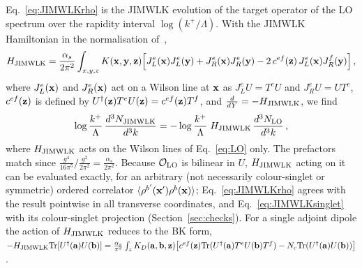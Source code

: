 Eq.~\eqref{eq:JIMWLKrho} is the JIMWLK evolution of the target operator of the LO spectrum over the rapidity interval $\log(k^+/\Lambda)$. With the JIMWLK Hamiltonian in the normalisation of~\cite{Lublinsky:2016meo},
\begin{align}\label{eq:HJIMWLK}
H_{\rm JIMWLK}=\frac{\alpha_s}{2\pi^2}\int_{x,y,z}K(\mathbf{x},\mathbf{y},\mathbf{z})\Big[J_L^e(\mathbf{x})J_L^e(\mathbf{y})+J_R^e(\mathbf{x})J_R^e(\mathbf{y})-2\,c^{ef}(\mathbf{z})\,J_L^e(\mathbf{x})J_R^f(\mathbf{y})\Big]\,,
\end{align}
where $J_L^e(\mathbf{x})$ and $J_R^e(\mathbf{x})$ act on a Wilson line at $\mathbf{x}$ as $J_L^eU=T^eU$ and $J_R^eU=UT^e$, $c^{ef}(\mathbf{z})$ is defined by $U^\dagger(\mathbf{z})T^eU(\mathbf{z})=c^{ef}(\mathbf{z})T^f$, and $\frac{d}{dY}=-H_{\rm JIMWLK}$, we find
\begin{align}\label{eq:JIMWLKasLO}
\log\frac{k^+}{\Lambda}\,\frac{d^3N_{\rm JIMWLK}}{d^3k}=-\log\frac{k^+}{\Lambda}\;H_{\rm JIMWLK}\,\frac{d^3N_{\rm LO}}{d^3k}\,,
\end{align}
where $H_{\rm JIMWLK}$ acts on the Wilson lines of Eq.~\eqref{eq:LO} only. The prefactors match since $\frac{g^4}{16\pi^5}\big/\frac{g^2}{2\pi^2}=\frac{\alpha_s}{2\pi^2}$. Because $\mathcal O_{\rm LO}$ is bilinear in $U$, $H_{\rm JIMWLK}$ acting on it can be evaluated exactly, for an arbitrary (not necessarily colour-singlet or symmetric) ordered correlator $\langle\rho^{b'}(\mathbf{x}')\rho^b(\mathbf{x})\rangle$; Eq.~\eqref{eq:JIMWLKrho} agrees with the result pointwise in all transverse coordinates, and Eq.~\eqref{eq:JIMWLKsinglet} with its colour-singlet projection (Section~\ref{sec:checks}). For a single adjoint dipole the action of $H_{\rm JIMWLK}$ reduces to the BK form, $-H_{\rm JIMWLK}{\rm Tr}[U^\dagger(\mathbf{a})U(\mathbf{b})]=\frac{\alpha_s}{\pi^2}\int_zK_D(\mathbf{a},\mathbf{b},\mathbf{z})\big[c^{ef}(\mathbf{z}){\rm Tr}(U^\dagger(\mathbf{a})T^eU(\mathbf{b})T^f)-N_c{\rm Tr}(U^\dagger(\mathbf{a})U(\mathbf{b}))\big]$.

